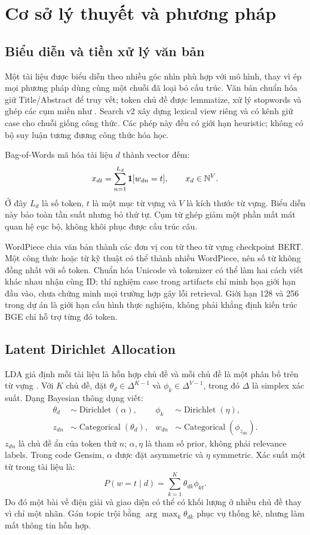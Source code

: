 \chapter{Cơ sở lý thuyết và phương pháp}\label{ch:methods}
\section{Biểu diễn và tiền xử lý văn bản}
Một tài liệu được biểu diễn theo nhiều góc nhìn phù hợp với mô hình, thay vì ép mọi phương pháp dùng cùng một chuỗi đã loại bỏ cấu trúc. Văn bản chuẩn hóa giữ Title/Abstract để truy vết; token chủ đề được lemmatize, xử lý stopwords và ghép các cụm miền như . Search v2 xây dựng lexical view riêng và có kênh giữ case cho chuỗi giống công thức. Các phép này đều có giới hạn heuristic; không có bộ suy luận tương đương công thức hóa học.

Bag-of-Words mã hóa tài liệu $d$ thành vector đếm:
\begin{equation}\label{eq:bow}
x_{dt}=\sum_{n=1}^{L_d}\mathbf{1}[w_{dn}=t],\qquad x_d\in\mathbb N^V.
\end{equation}
Ở đây $L_d$ là số token, $t$ là một mục từ vựng và $V$ là kích thước từ vựng. Biểu diễn này bảo toàn tần suất nhưng bỏ thứ tự. Cụm từ ghép giảm một phần mất mát quan hệ cục bộ, không khôi phục được cấu trúc câu.

WordPiece chia văn bản thành các đơn vị con từ theo từ vựng checkpoint BERT. Một công thức hoặc từ kỹ thuật có thể thành nhiều WordPiece, nên số từ không đồng nhất với số token. Chuẩn hóa Unicode và tokenizer có thể làm hai cách viết khác nhau nhận cùng ID; thí nghiệm case trong artifacts chỉ minh họa giới hạn đầu vào, chưa chứng minh mọi trường hợp gây lỗi retrieval. Giới hạn 128 và 256 trong dự án là giới hạn cấu hình thực nghiệm, không phải khẳng định kiến trúc BGE chỉ hỗ trợ từng đó token.

\section{Latent Dirichlet Allocation}
LDA giả định mỗi tài liệu là hỗn hợp chủ đề và mỗi chủ đề là một phân bố trên từ vựng \cite{lda}. Với $K$ chủ đề, đặt $\theta_d\in\Delta^{K-1}$ và $\phi_k\in\Delta^{V-1}$, trong đó $\Delta$ là simplex xác suất. Dạng Bayesian thông dụng viết:
\begin{align}
\theta_d&\sim\operatorname{Dirichlet}(\alpha), &
\phi_k&\sim\operatorname{Dirichlet}(\eta),\label{eq:lda-prior}\\
z_{dn}&\sim\operatorname{Categorical}(\theta_d), &
w_{dn}&\sim\operatorname{Categorical}(\phi_{z_{dn}}).\label{eq:lda-gen}
\end{align}
$z_{dn}$ là chủ đề ẩn của token thứ $n$; $\alpha,\eta$ là tham số prior, không phải relevance labels. Trong code Gensim, $\alpha$ được đặt asymmetric và $\eta$ symmetric. Xác suất một từ trong tài liệu là:
\begin{equation}\label{eq:lda-mixture}
P(w=t\mid d)=\sum_{k=1}^{K}\theta_{dk}\phi_{kt}.
\end{equation}
Do đó một bài về điện giải và giao diện có thể có khối lượng ở nhiều chủ đề thay vì chỉ một nhãn. Gán topic trội bằng $\arg\max_k\theta_{dk}$ phục vụ thống kê, nhưng làm mất thông tin hỗn hợp.

